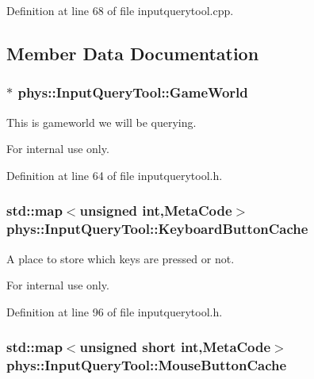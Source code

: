 Definition at line 68 of file inputquerytool.cpp.



\subsection{Member Data Documentation}
\hypertarget{classphys_1_1InputQueryTool_ab24a64fc316eefb7e88c1ed75ecee7ea}{
\subsubsection[{GameWorld}]{$\ast$ {\bf phys::InputQueryTool::GameWorld}}}
\label{da/d96/classphys_1_1InputQueryTool_ab24a64fc316eefb7e88c1ed75ecee7ea}


This is gameworld we will be querying. 

\begin{DoxyInternal}{For internal use only.}
\end{DoxyInternal}


Definition at line 64 of file inputquerytool.h.

\hypertarget{classphys_1_1InputQueryTool_afd89b917cb11be11dc990d5ef9ddb2ff}{
\subsubsection[{KeyboardButtonCache}]{\setlength{\rightskip}{0pt plus 5cm}std::map$<$unsigned int,{\bf MetaCode}$>$ {\bf phys::InputQueryTool::KeyboardButtonCache}}}
\label{da/d96/classphys_1_1InputQueryTool_afd89b917cb11be11dc990d5ef9ddb2ff}


A place to store which keys are pressed or not. 

\begin{DoxyInternal}{For internal use only.}
\end{DoxyInternal}


Definition at line 96 of file inputquerytool.h.

\hypertarget{classphys_1_1InputQueryTool_a2fddedc3d3ac61a195289b55b0aec972}{
\subsubsection[{MouseButtonCache}]{\setlength{\rightskip}{0pt plus 5cm}std::map$<$unsigned short int,{\bf MetaCode}$>$ {\bf phys::InputQueryTool::MouseButtonCache}}}
\label{da/d96/classphys_1_1InputQueryTool_a2fddedc3d3ac61a195289b55b0aec972}


